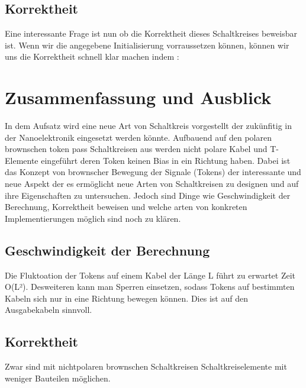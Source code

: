 \documentclass[11pt,a4paper]{article}
\begin{document}

\subsection{Korrektheit}
Eine interessante Frage ist nun ob die Korrektheit dieses Schaltkreises
beweisbar ist. Wenn wir die angegebene Initialisierung vorraussetzen können,
können wir uns die Korrektheit schnell klar machen indem :



\section{Zusammenfassung und Ausblick}
In dem Aufsatz \cite{Peper_nonPolar_2018} wird eine neue Art
von Schaltkreis vorgestellt der zukünfitig in der Nanoelektronik eingesetzt
werden könnte.
%
Aufbauend auf den polaren brownschen token pass Schaltkreisen aus 
\cite{Peper_Fundamentals_2013} werden nicht polare Kabel und T-Elemente 
eingeführt deren Token keinen Bias in ein Richtung haben. 
%
Dabei ist das Konzept von brownscher Bewegung der Signale (Tokens) 
der interessante und neue Aspekt der es ermöglicht neue Arten von Schaltkreisen 
zu designen und auf ihre Eigenschaften zu untersuchen.
%
Jedoch sind Dinge wie Geschwindigkeit der Berechnung, Korrektheit beweisen und 
welche arten von konkreten Implementierungen möglich sind noch zu klären.


\subsection{Geschwindigkeit der Berechnung}
Die Fluktoation der Tokens auf einem Kabel der Länge L führt zu 
erwartet Zeit O(L²).
%
Desweiteren kann man Sperren einsetzen, sodass Tokens
auf bestimmten Kabeln sich nur in eine Richtung bewegen können. 
%
Dies ist auf den Ausgabekabeln sinnvoll.


\subsection{Korrektheit}
Zwar sind mit nichtpolaren brownschen Schaltkreisen Schaltkreiselemente mit
weniger Bauteilen möglichen.
\end{document}

